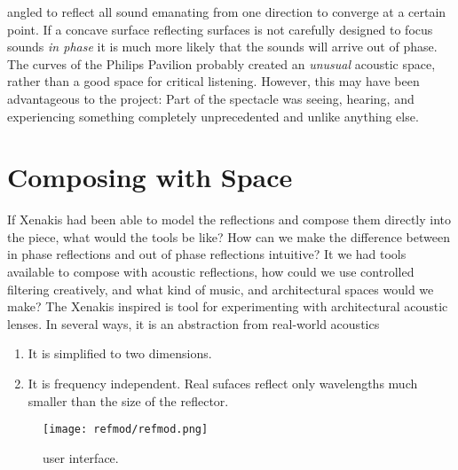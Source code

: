 angled to reflect all sound emanating from one direction to converge
at a certain point. If a concave surface reflecting surfaces is not
carefully designed to focus sounds \textit{in phase} it is much more
likely that the sounds will arrive out of phase. The curves of the
Philips Pavilion probably created an \emph{unusual} acoustic space,
rather than a good space for critical listening. However, this may
have been advantageous to the project: Part of the spectacle was
seeing, hearing, and experiencing something completely unprecedented
and unlike anything else.

\section{Composing with Space}
\label{sec:composing-with-space}
If Xenakis had been able to model the reflections and compose them
directly into the piece, what would the tools be like? How can we make
the difference between in phase reflections and out of phase
reflections intuitive?  It we had tools available to compose with
acoustic reflections, how could we use controlled filtering
creatively, and what kind of music, and architectural spaces would we
make? The Xenakis inspired  is tool for experimenting with
architectural acoustic lenses. In several ways, it is an abstraction
from real-world acoustics
\begin{enumerate}
\item It is simplified to two dimensions.
\item It is frequency independent. Real sufaces reflect only
  wavelengths much smaller than the size of the
  reflector.\cite{Zhixin2005}
\end{enumerate}


\begin{figure*}[]
  \texttt{[image: refmod/refmod.png]}
  \caption[Tempo Transition]{ user interface.}
  \label{fig:basic-tempo-change}
\end{figure*}


